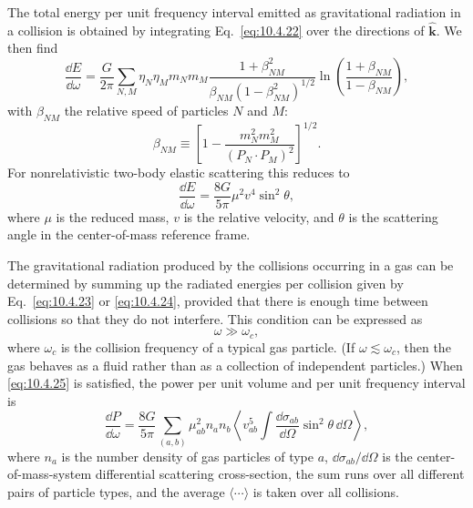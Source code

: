 The total energy per unit frequency interval emitted as gravitational
radiation in a collision is obtained by integrating Eq.~\eqref{eq:10.4.22}
over the directions of \(\widehat{\mathbf{k}}\). We then find
\begin{equation}
  \frac{\dd E}{\dd\omega}
  =
  \frac{G}{2\pi}
  \sum_{N,M}\eta_N\eta_Mm_Nm_M
  \frac{1+\beta_{NM}^2}
       {\beta_{NM}(1-\beta_{NM}^2)^{1/2}}
  \ln\!\left(\frac{1+\beta_{NM}}{1-\beta_{NM}}\right),
  \tag{10.4.23}\label{eq:10.4.23}
\end{equation}
with \(\beta_{NM}\) the relative speed of particles \(N\) and \(M\):
\[
  \beta_{NM}
  \equiv
  \left[
    1-\frac{m_N^2m_M^2}{(P_N\cdot P_M)^2}
  \right]^{1/2}.
\]
For nonrelativistic two-body elastic scattering this reduces to
\begin{equation}
  \frac{\dd E}{\dd\omega}
  =
  \frac{8G}{5\pi}\mu^2v^4\sin^2\theta,
  \tag{10.4.24}\label{eq:10.4.24}
\end{equation}
where \(\mu\) is the reduced mass, \(v\) is the relative velocity, and
\(\theta\) is the scattering angle in the center-of-mass reference frame.

The gravitational radiation produced by the collisions occurring in a gas
can be determined by summing up the radiated energies per collision given by
Eq.~\eqref{eq:10.4.23} or \eqref{eq:10.4.24}, provided that there is enough
time between collisions so that they do not interfere. This condition can be
expressed as
\begin{equation}
  \omega\gg\omega_c,
  \tag{10.4.25}\label{eq:10.4.25}
\end{equation}
where \(\omega_c\) is the collision frequency of a typical gas particle. (If
\(\omega\lesssim\omega_c\), then the gas behaves as a fluid rather than as a
collection of independent particles.) When \eqref{eq:10.4.25} is satisfied,
the power per unit volume and per unit frequency interval is
\begin{equation}
  \frac{\dd P}{\dd\omega}
  =
  \frac{8G}{5\pi}
  \sum_{(a,b)}\mu_{ab}^2n_an_b
  \left\langle
    v_{ab}^5
    \int\frac{\dd\sigma_{ab}}{\dd\Omega}\sin^2\theta\,\dd\Omega
  \right\rangle,
  \tag{10.4.26}\label{eq:10.4.26}
\end{equation}
where \(n_a\) is the number density of gas particles of type \(a\),
\(\dd\sigma_{ab}/\dd\Omega\) is the center-of-mass-system differential
scattering cross-section, the sum runs over all different pairs of particle
types, and the average \(\langle\cdots\rangle\) is taken over all collisions.


